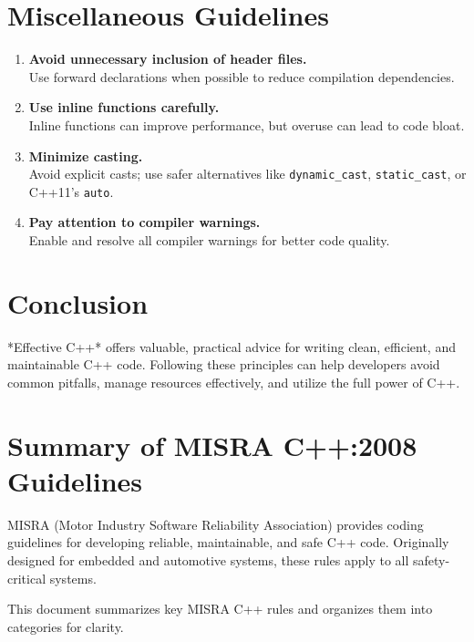 \section{Miscellaneous Guidelines}
\begin{enumerate}
    \item \textbf{Avoid unnecessary inclusion of header files.} \\
    Use forward declarations when possible to reduce compilation dependencies.

    \item \textbf{Use inline functions carefully.} \\
    Inline functions can improve performance, but overuse can lead to code bloat.

    \item \textbf{Minimize casting.} \\
    Avoid explicit casts; use safer alternatives like \texttt{dynamic\_cast}, \texttt{static\_cast}, or C++11's \texttt{auto}.
    
    \item \textbf{Pay attention to compiler warnings.} \\
    Enable and resolve all compiler warnings for better code quality.
\end{enumerate}

\section{Conclusion}
*Effective C++* offers valuable, practical advice for writing clean, efficient, and maintainable C++ code. Following these principles can help developers avoid common pitfalls, manage resources effectively, and utilize the full power of C++.


\section{Summary of MISRA C++:2008 Guidelines}
MISRA (Motor Industry Software Reliability Association) provides coding guidelines for developing reliable, maintainable, and safe C++ code. Originally designed for embedded and automotive systems, these rules apply to all safety-critical systems.

This document summarizes key MISRA C++ rules and organizes them into categories for clarity.

